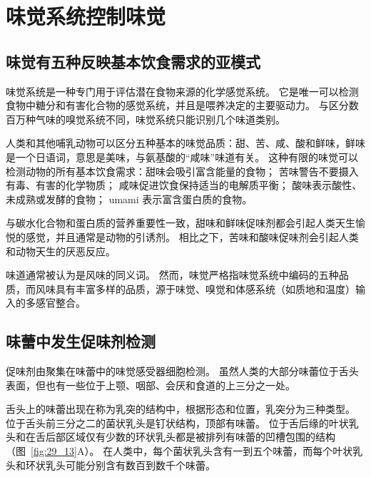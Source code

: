 \section{味觉系统控制味觉}

\subsection{味觉有五种反映基本饮食需求的亚模式}

味觉系统是一种专门用于评估潜在食物来源的化学感觉系统。
它是唯一可以检测食物中糖分和有害化合物的感觉系统，并且是喂养决定的主要驱动力。
与区分数百万种气味的嗅觉系统不同，味觉系统只能识别几个味道类别。


人类和其他哺乳动物可以区分五种基本的味觉品质：甜、苦、咸、酸和鲜味，鲜味是一个日语词，意思是美味，与氨基酸的“咸味”味道有关。
这种有限的味觉可以检测动物的所有基本饮食需求：甜味会吸引富含能量的食物；
苦味警告不要摄入有毒、有害的化学物质；
咸味促进饮食保持适当的电解质平衡；
酸味表示酸性、未成熟或发酵的食物；
umami 表示富含蛋白质的食物。


与碳水化合物和蛋白质的营养重要性一致，甜味和鲜味促味剂都会引起人类天生愉悦的感觉，并且通常是动物的引诱剂。
相比之下，苦味和酸味促味剂会引起人类和动物天生的厌恶反应。


味道通常被认为是风味的同义词。
然而，味觉严格指味觉系统中编码的五种品质，而风味具有丰富多样的品质，源于味觉、嗅觉和体感系统（如质地和温度）输入的多感官整合。



\subsection{味蕾中发生促味剂检测}

促味剂由聚集在味蕾中的味觉感受器细胞检测。
虽然人类的大部分味蕾位于舌头表面，但也有一些位于上颚、咽部、会厌和食道的上三分之一处。


舌头上的味蕾出现在称为乳突的结构中，根据形态和位置，乳突分为三种类型。
位于舌头前三分之二的菌状乳头是钉状结构，顶部有味蕾。
位于舌后缘的叶状乳头和在舌后部区域仅有少数的环状乳头都是被排列有味蕾的凹槽包围的结构（图~\ref{fig:29_13}A）。
在人类中，每个菌状乳头含有一到五个味蕾，而每个叶状乳头和环状乳头可能分别含有数百到数千个味蕾。


